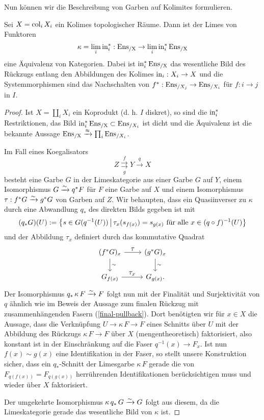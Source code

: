 Nun können wir die Beschreibung von Garben auf Kolimites formulieren.
\begin{satz} \label{sheaf-col}
  Sei $X = \operatorname{col}_i X_i$ ein Kolimes topologischer Räume. Dann ist der
  Limes von Funktoren
  \[ \kappa = \lim_i \operatorname{in}_i^*: \operatorname{Ens_{/X}} \to \lim_i \operatorname{in}_i^* \operatorname{Ens_{/X}} \]
  eine Äquivalenz von Kategorien. Dabei ist $\operatorname{in}_i^* \operatorname{Ens_{/X}}$ das
  wesentliche Bild des Rückzugs entlang den Abbildungen des Kolimes
  $\operatorname{in}_i: X_i \to X$ und die Systemmorphismen sind das Nachschalten
  von $f^*: \operatorname{Ens}_{/X_j} \to \operatorname{Ens}_{/X_i}$ für $f: i \to j$ in $I$.
\end{satz}
\begin{proof}
  Ist $X = \coprod_i X_i$ ein Koprodukt (d. h. $I$ diskret), so sind
  die $\operatorname{in}_i^*$ Restriktionen, das Bild $\operatorname{in}_i^* \operatorname{Ens_{/X}} \subset
  \operatorname{Ens}_{/X_i}$ ist dicht und die Äquivalenz ist die bekannte Aussage
  $\operatorname{Ens_{/X}} \xrightarrow{\approx} \prod_i \operatorname{Ens}_{/X_i}$.

  Im Fall eines Koegalisators
  \[ Z \overset{f}{\underset{g}{\rightrightarrows}} Y \xrightarrow{q} X \]
  besteht eine Garbe $G$ in der Limeskategorie aus einer Garbe $G$ auf
  $Y$, einem Isomorphismus $G \xrightarrow[]{\sim} q^* F$ für $F$ eine Garbe auf $X$
  und einem Isomorphismus $\tau: f^* G \xrightarrow[]{\sim} g^* G$ von Garben auf
  $Z$. Wir behaupten, dass ein Quasiinverser zu $\kappa$ durch eine
  Abwandlung $q_*$ des direkten Bilds gegeben ist mit
  \[ (q_* G)(U) := \left\{ s \in G(q^{-1}(U)) \,\middle|\, \tau_x(s_{f(x)}) = s_{g(x)}
    \text{ für alle } x \in (q \circ f)^{-1}(U)  \right\}
  \]
  und der Abbildung $\tau_x$ definiert durch das kommutative Quadrat
  \[
  \begin{tikzcd}
    (f^* G)_x \dar{\sim} \rar{\textstyle\tau} & (g^* G)_x \dar{\sim} \\
    G_{f(x)} \rar{\textstyle\tau_x} & G_{g(x)}.
  \end{tikzcd}
  \]
  Der Isomorphismus $q_* \, \kappa \, F \xrightarrow[]{\sim} F$ folgt nun mit der
  Finalität und Surjektivität von $q$ ähnlich wie im Beweis der
  Aussage zum finalen Rückzug mit zusammenhängenden Fasern
  (\ref{final-pullback}). Dort benötigten wir für $x \in X$ die
  Aussage, dass die Verknüpfung $U \to \kappa \,F \to F$ eines
  Schnitts über $U$ mit der Abbildung des Rückzugs $\kappa \, F \to F$
  über $X$ (mengentheoretisch) faktorisiert, also konstant ist in der
  Einschränkung auf die Faser $q^{-1}(x) \to F_x$. Ist nun $f(x) \sim
  g(x)$ eine Identifikation in der Faser, so stellt unsere
  Konstruktion sicher, dass ein $q_*$-Schnitt der Limesgarbe $\kappa
  \, F$ gerade die von $F_{q(f(x))} = F_{q(g(x))}$ herrührenden
  Identifikationen berücksichtigen muss und wieder über $X$
  faktorisiert.

  Der umgekehrte Isomorphismus $\kappa \, q_* \, G \xrightarrow[]{\sim} G$ folgt aus
  diesem, da die Limeskategorie gerade das wesentliche Bild von
  $\kappa$ ist.
\end{proof}
